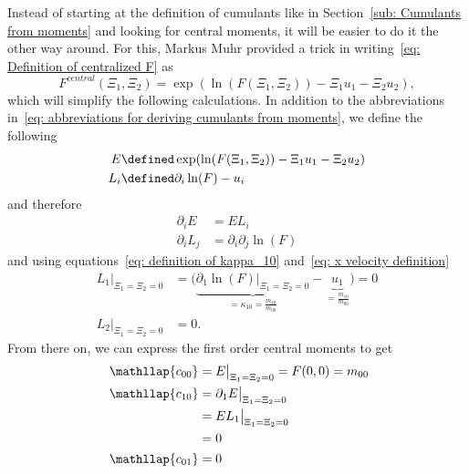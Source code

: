 Instead of starting at the definition of cumulants like in Section~\ref{sub: Cumulants from moments} and looking for central moments, it will be easier to do it the other way around.
For this, Markus Muhr provided a trick in writing~\eqref{eq: Definition of centralized F} as
\begin{equation}
  F^{central}(\Xi_1, \Xi_2) = \exp(\ln(F(\Xi_1,\Xi_2)) - \Xi_1 u_1 - \Xi_2 u_2),
\end{equation}
which will simplify the following calculations.
In addition to the abbreviations in~\eqref{eq: abbreviations for deriving cumulants from moments}, we define the following
\begin{equation}
  \label{eq: additional abbreviations}
  \begin{aligned}
    E & \defined \exp(\ln(F(\Xi_1,\Xi_2)) - \Xi_1 u_1 - \Xi_2 u_2) \\
    L_i & \defined \partial_i \ln(F) - u_i
  \end{aligned}
\end{equation}
and therefore
\begin{equation}
  \begin{aligned}
    \partial_i E & = EL_i \\
    \partial_i L_j & = \partial_i\partial_j\ln(F)
  \end{aligned}
\end{equation}
and using equations~\eqref{eq: definition of kappa_10} and~\eqref{eq: x velocity definition}
\begin{equation}
  \begin{aligned}
    L_1\bigr|_{\Xi_1=\Xi_2 = 0} & = \bigg(
      \underbrace{ \partial_1\ln(F) \bigr|_{\Xi_1=\Xi_2 = 0}}_{ = \kappa_{10} = \frac{m_{10}}{m_{00}}}
      - \underbrace{u_1}_{ = \frac{m_{10}}{m_{00}}} \bigg) = 0 \\
    L_2\bigr|_{\Xi_1=\Xi_2 = 0} & = 0.
  \end{aligned}
\end{equation}
From there on, we can express the first order central moments to get
\begin{align*}
  \phantom{c_{00}}
  &\begin{aligned}
  \nonumber
    \mathllap{c_{00}} & = E\bigr|_{\Xi_1=\Xi_2 = 0} = F(0,0) = m_{00}
  \end{aligned}\\
  &\begin{aligned}
  \nonumber
    \mathllap{c_{10}} & =  \partial_1 E  \bigr|_{\Xi_1=\Xi_2 = 0} \\
    & = EL_1  \bigr|_{\Xi_1=\Xi_2 = 0} \\
    & = 0
  \end{aligned}\\
  &\begin{aligned}
  \nonumber
    \mathllap{c_{01}} & = 0
  \end{aligned}\\
\end{align*}
